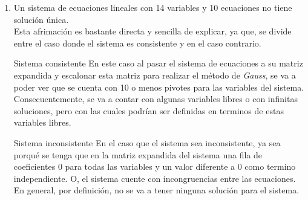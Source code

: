 \documentclass{article}
\begin{document}
\begin{enumerate}
\begin{enumerate}[label=\listAlph]
                todas las variables simplemente sean 0: \(x_1 = x_2 = \cdots = x_{n - 1} = x_n = 0\). \\ 
                Tambien, analizando que el sistema de ecuaciones \(S_1\) solo tenga una solución implica que no tenga ningún elemento libre.
                Concluyendo que, con esta información de los sistemas, la única solución de \(S_h\) sería la trivial. 
                Ya que al no tener ningún elemento libre en ambos sistemas solo puede existir la solución trivial para \(S_h\).
                Dado que cada valor tiene que tomar un valor fijo. Y, los únicos valores que resuelven a \(S_h\) es la solución trival: \(x_1 = x_2 = \cdots = x_{n - 1} = x_n = 0\).
			\item Un sistema de ecuaciones lineales con 14 variables y 10 ecuaciones no tiene solución única. \\
                Esta afrimación es bastante directa y sencilla de explicar, ya que, se divide entre el caso donde el sistema es consistente y en el caso contrario.
                \ResetCases{}
                \begin{mathcase}{Sistema consistente}
                    En este caso al pasar el sistema de ecuaciones a su matriz expandida y escalonar esta matriz para realizar el método de \emph{Gauss}, 
                    se va a poder ver que se cuenta con 10 o menos pivotes para las variables del sistema. 
                    Consecuentemente, se va a contar con algunas variables libres o con infinitas soluciones, pero con las cuales podrían ser definidas en terminos de estas variables libres.
                \end{mathcase}
                \begin{mathcase}{Sistema inconsistente}
                    En el caso que el sistema sea inconsistente, ya sea porqué se tenga que en la matriz expandida del sistema una fila de coeficientes 0 para todas las variables y un valor 
                    diferente a 0 como termino independiente. O, el sistema cuente con incongruencias entre las ecuaciones. En general, por definición, no se va a tener ninguna solución para el sistema.
                \end{mathcase}
            \setcounter{enumii}{6}

\end{enumerate}
\end{enumerate}
\end{document}
